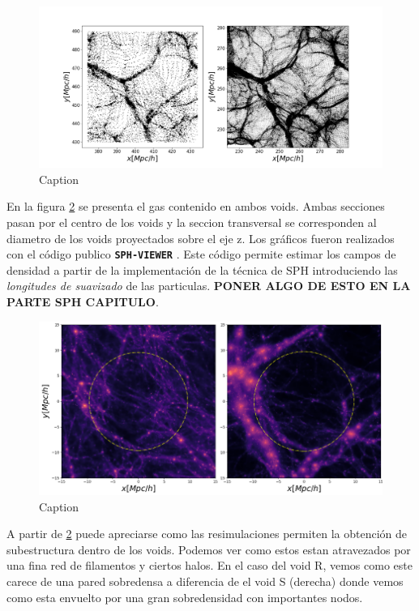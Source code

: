\begin{figure}
    \centering
    \includegraphics[width=15cm]{Figures/Resi.png}
    \caption{Caption}
    \label{fig:my_label}
\end{figure}{}


En la figura \ref{VoidsIn} se presenta el gas contenido en ambos voids. Ambas secciones pasan por el centro de los voids y la seccion transversal se corresponden al diametro de los voids proyectados sobre el eje z. Los gr\'aficos fueron realizados con el c\'odigo publico \texttt{\textbf{SPH-VIEWER}} \citep{SphViewer}. Este c\'odigo permite estimar los campos de densidad a partir de la implementaci\'on de la t\'ecnica de SPH introduciendo las \textit{longitudes de suavizado} de las particulas. \textbf{PONER ALGO DE ESTO EN LA PARTE SPH CAPITULO}.
\begin{figure}
    \centering
    \includegraphics[width=15cm]{Figures/SphVoids.png}
    \caption{Caption}
    \label{VoidsIn}
\end{figure}{}
A partir de \ref{VoidsIn} puede apreciarse como las resimulaciones permiten la obtenci\'on de subestructura dentro de los voids. Podemos ver como estos estan atravezados por una fina red de filamentos y ciertos halos. En el caso del void R, vemos como este carece de una pared sobredensa a diferencia de el void S (derecha) donde vemos como esta envuelto por una gran sobredensidad con importantes nodos. 


